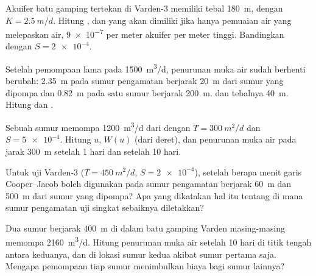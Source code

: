 \begin{exercise}[$\star$]\label{exo:b3:hydrogeology:4}
Akuifer batu gamping tertekan di Varden-3 memiliki tebal \qty{180}{m}, dengan $K =
\qty{2.5}{m/d}$. Hitung , dan  yang akan
dimiliki jika hanya pemuaian air yang melepaskan air, \num{9e-7} per meter akuifer
per meter tinggi. Bandingkan dengan $S = \num{2e-4}$.
\end{exercise}

\begin{exercise}[$\star\star$]\label{exo:b3:hydrogeology:5}
Setelah pemompaan lama pada \qty{1500}{m^3/d}, penurunan muka air sudah
berhenti berubah: \qty{2.35}{m} pada sumur pengamatan berjarak \qty{20}{m} dari
sumur yang dipompa dan \qty{0.82}{m} pada satu sumur berjarak \qty{200}{m}.  dan tebalnya \qty{40}{m}. Hitung  dan .
\end{exercise}

\begin{exercise}[$\star\star$]\label{exo:b3:hydrogeology:6}
Sebuah sumur memompa \qty{1200}{m^3/d} dari  dengan $T =
\qty{300}{m^2/d}$ dan $S = \num{5e-4}$. Hitung $u$, $W(u)$ (dari
deret), dan penurunan muka air pada jarak \qty{300}{m} setelah 1 hari dan setelah 10 hari.
\end{exercise}

\begin{exercise}[$\star\star$]\label{exo:b3:hydrogeology:7}
Untuk uji Varden-3 ($T = \qty{450}{m^2/d}$, $S = \num{2e-4}$), setelah
berapa menit garis Cooper--Jacob boleh digunakan pada sumur pengamatan
berjarak \qty{60}{m} dan \qty{500}{m} dari sumur yang dipompa? Apa yang
dikatakan hal itu tentang di mana sumur pengamatan uji singkat sebaiknya diletakkan?
\end{exercise}

\begin{exercise}[$\star\star$]\label{exo:b3:hydrogeology:8}
Dua sumur berjarak \qty{400}{m} di dalam batu gamping Varden masing-masing memompa
\qty{2160}{m^3/d}. Hitung penurunan muka air setelah 10 hari di titik tengah antara keduanya,
dan di lokasi sumur kedua akibat sumur pertama saja. Mengapa pemompaan
tiap sumur menimbulkan biaya bagi sumur lainnya?
\end{exercise}

